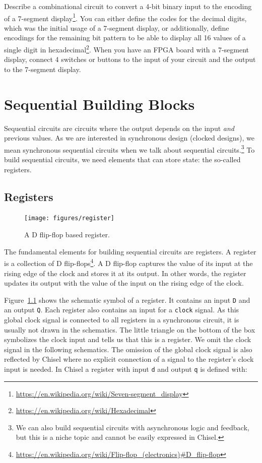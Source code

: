 \documentclass[%
    10pt,
    headinclude, footexclude,
    openright, %
    notitlepage,
    cleardoubleempty,
    headsepline,
    pointlessnumbers,
    bibtotoc, idxtotoc,
    ]{scrbook}
\newcommand{\code}[1]{{\small{\texttt{#1}}}}
\newcommand{\myref}[2]{\href{#1}{#2}}
\renewcommand{\myref}[2]{{#2}{\footnote{\url{#1}}}}
\begin{document}
Describe a combinational circuit to convert a 4-bit binary input to the encoding of a
\myref{https://en.wikipedia.org/wiki/Seven-segment_display}{7-segment display}.
You can either define the codes for the decimal digits, which was the initial
usage of a 7-segment display, or additionally, define encodings for the remaining bit pattern
to be able to display all 16 values of a single digit in
\myref{https://en.wikipedia.org/wiki/Hexadecimal}{hexadecimal}.
When you have an FPGA board with a 7-segment display, connect 4 switches or
buttons to the input of your circuit and the output to the 7-segment display.

\chapter{Sequential Building Blocks}
\label{sec:sequential}

Sequential circuits are circuits where the output depends on the input \emph{and}
previous values. As we are interested in synchronous design (clocked designs),
we mean synchronous sequential circuits when we talk about sequential
circuits.\footnote{We can also build sequential circuits with asynchronous logic and
feedback, but this is a niche topic and cannot be easily expressed in Chisel.}
To build sequential circuits, we need elements that can store state:
the so-called registers.

\section{Registers}


\begin{figure}
  \centering
  \texttt{[image: figures/register]}
  \caption{A D flip-flop based register.}
  \label{fig:register}
\end{figure}

The fundamental elements for building sequential circuits are registers. A register is a collection
of \myref{https://en.wikipedia.org/wiki/Flip-flop_(electronics)\#D_flip-flop}{D flip-flops}.
A D flip-flop captures the value of its input at the rising edge of the clock and stores
it at its output. In other words, the register updates its output with the value of the input on the rising edge of the clock. %

Figure~\ref{fig:register} shows the schematic symbol of a register. It contains an input
\code{D} and an output \code{Q}. Each register also contains an input for a \code{clock} signal.
As this global clock signal is connected to all registers in a synchronous circuit, it is usually
not drawn in the schematics. The little triangle on the bottom of the box symbolizes the
clock input and tells us that this is a register. We omit the clock signal in the following
schematics.
The omission of the global clock signal is also reflected by Chisel where no explicit
connection of a signal to the register's clock input is needed.
In Chisel a register with input \code{d} and output \code{q} is defined with:
\end{document}
